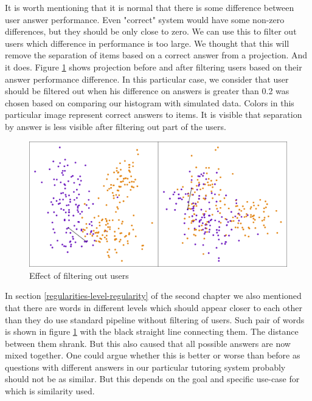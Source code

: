 \documentclass[
  digital, %
  table,   %
  nolof,     %
  nolot,     %
  nocover,
  color,
  final, %
]{fithesis3}
\begin{document}

It is worth mentioning that it is normal that there is some difference between user answer performance. Even "correct" system would have some non-zero differences, but they should be only close to zero. We can use this to filter out users which difference in performance is too large. We thought that this will remove the separation of items based on a correct answer from a projection. And it does. Figure \ref{fig:answers_normalization} shows projection before and after filtering users based on their answer performance difference. In this particular case, we consider that user should be filtered out when his difference on answers is greater than 0.2 was chosen based on comparing our histogram with simulated data. Colors in this particular image represent correct answers to items. It is visible that separation by answer is less visible after filtering out part of the users.

\begin{figure}
  \includegraphics[width=\textwidth]{img/answers_normalization}
  \caption{Effect of filtering out users}
  \label{fig:answers_normalization}
\end{figure}

In section \ref{regularities-level-regularity} of the second chapter we also mentioned that there are words in different levels which should appear closer to each other than they do use standard pipeline without filtering of users. Such pair of words is shown in figure \ref{fig:answers_normalization} with the black straight line connecting them. The distance between them shrank. But this also caused that all possible answers are now mixed together. One could argue whether this is better or worse than before as questions with different answers in our particular tutoring system probably should not be as similar. But this depends on the goal and specific use-case for which is similarity used.
\end{document}
